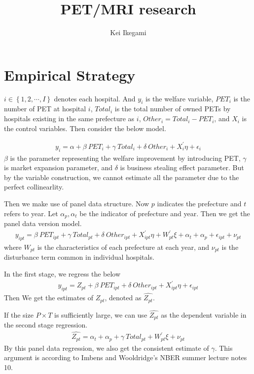 \documentclass{article}
\begin{document}
\title{PET/MRI research}
\author{Kei Ikegami}
\maketitle

\section{Empirical Strategy}

$i \in \left\{ 1,2, \cdots, I\right\}$ denotes each hospital. And $y_i$ is the welfare variable, $PET_i$ is the number of PET at hospital $i$, $Total_i$ is the total number of owned PETs by hospitals existing in the same prefecture as $i$, $Other_i =Total_i - PET_i$, and $X_i$ is the control variables. Then consider the below model.

\begin{align*}
	y_i = \alpha + \beta\ PET_i + \gamma\ Total_i + \delta\ Other_i + X_i^{'} \eta + \epsilon_i
\end{align*}
$\beta$ is the parameter representing the welfare improvement by introducing PET, $\gamma$ is market expansion parameter, and $\delta$ is business stealing effect parameter. But by the variable construction, we cannot estimate all the parameter due to the perfect collinearlity. 

Then we make use of panel data structure. Now $p$ indicates the prefecture and $t$ refers to year. Let $\alpha_p, \alpha_t$ be the indicator of prefecture and year. Then we get the panel data version model.
\begin{align*}
	y_{ipt} = \beta\ PET_{ipt} + \gamma\ Total_{pt} + \delta\ Other_{ipt} + X_{ipt}^{'} \eta +W_{pt}^{'} \xi +  \alpha_t + \alpha_p + \epsilon_{ipt} + \nu_{pt}
\end{align*}
where $W_{pt}$ is the characteristics of each prefecture at each year, and $\nu_{pt}$ is the disturbance term common in individual hospitals.

In the first stage, we regress the below
\begin{align*}
	y_{ipt} = Z_{pt} + \beta\ PET_{ipt} + \delta\ Other_{ipt} + X_{ipt}^{'} \eta + \epsilon_{ipt}
\end{align*}
Then We get the estimates of $Z_{pt}$, denoted as $\hat{Z_{pt}}$.

If the size $P \times T$ is sufficiently large, we can use $\hat{Z_{pt}}$ as the dependent variable in the second stage regression.
\begin{align*}
	\hat{Z_{pt}} = \alpha_t + \alpha_p + \gamma\ Total_{pt} + W_{pt}^{'} \xi +  \nu_{pt}
\end{align*}
By this panel data regression, we also get the consistent estimate of $\gamma$. This argument is according to Imbens and Wooldridge's NBER summer lecture notes 10.
\end{document}
